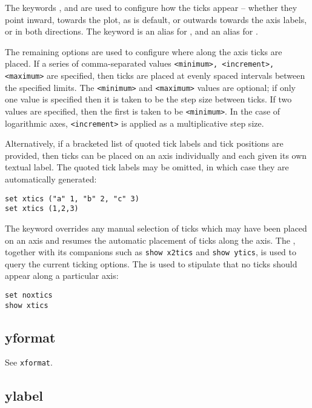 The keywords ,  and  are used to
configure how the ticks appear -- whether they point inward, towards the plot,
as is default, or outwards towards the axis labels, or in both directions.  The
keyword  is an alias for , and 
an alias for .

The remaining options are used to configure where along the axis ticks are
placed. If a series of comma-separated values {\tt <minimum>, <increment>,
<maximum>} are specified, then ticks are placed at evenly spaced intervals
between the specified limits. The {\tt <minimum>} and {\tt <maximum>} values
are optional; if only one value is specified then it is taken to be the step
size between ticks. If two values are specified, then the first is taken to be
{\tt <minimum>}. In the case of logarithmic axes, {\tt <increment>} is applied
as a multiplicative step size.

Alternatively, if a bracketed list of quoted tick labels and tick positions are
provided, then ticks can be placed on an axis individually and each given its
own textual label. The quoted tick labels may be omitted, in which case they
are automatically generated:
\begin{verbatim}
set xtics ("a" 1, "b" 2, "c" 3)
set xtics (1,2,3)
\end{verbatim}
The keyword  overrides any manual selection of ticks which
may have been placed on an axis and resumes the automatic placement of ticks
along the axis. The , together with its companions such as
{\tt show x2tics} and {\tt show ytics}, is used to query the current
ticking options. The  is used to stipulate that no
ticks should appear along a particular axis:

\begin{verbatim}
set noxtics
show xtics
\end{verbatim}


\subsection{yformat}

See {\tt xformat}.


\subsection{ylabel}

